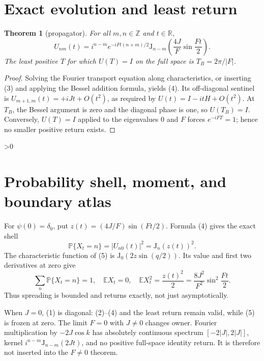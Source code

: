 \documentclass[10pt]{article}
\providecommand{\CRevisionRound}{2}
\newtheorem{theorem}{Theorem}
\newcommand{\Z}{\mathbb Z}
\begin{document}
\section{Exact evolution and least return}
\begin{theorem}[propagator]
For all $m,n\in\Z$ and $t\in\mathbb R$,
\begin{equation}
 U_{nm}(t)=i^{n-m}e^{-iFt(n+m)/2}
 \mathrm J_{n-m}\!\left(\frac{4J}{F}\sin\frac{Ft}{2}\right). \tag{4}
\end{equation}
The least positive $T$ for which $U(T)=I$ on the full space is
$T_B=2\pi/|F|$.
\end{theorem}
\begin{proof}
Solving the Fourier transport equation along characteristics, or inserting
(3) and applying the Bessel addition formula, yields (4).  Its off-diagonal
sentinel is $U_{m+1,m}(t)=+iJt+O(t^2)$, as required by
$U(t)=I-itH+O(t^2)$.  At $T_B$, the Bessel argument is zero and the diagonal
phase is one, so $U(T_B)=I$.  Conversely, $U(T)=I$ applied to the eigenvalues
$0$ and $F$ forces $e^{-iFT}=1$; hence no smaller positive return exists.
\end{proof}

\ifnum\CRevisionRound>0
\section{Probability shell, moment, and boundary atlas}
For $\psi(0)=\delta_0$, put
$z(t)=(4J/F)\sin(Ft/2)$.  Formula (4) gives the exact shell
\begin{equation}
 \mathbb P\{X_t=n\}=|U_{n0}(t)|^2=\mathrm J_n(z(t))^2.       \tag{5}
\end{equation}
The characteristic function of (5) is
$\mathrm J_0(2z\sin(q/2))$.  Its value and first two derivatives at zero give
\begin{equation}
 \sum_n\mathbb P\{X_t=n\}=1,\quad \mathbb E X_t=0,\quad
 \mathbb E X_t^2=\frac{z(t)^2}{2}=\frac{8J^2}{F^2}\sin^2\frac{Ft}{2}. \tag{6}
\end{equation}
Thus spreading is bounded and returns exactly, not just asymptotically.

When $J=0$, (1) is diagonal: (2)--(4) and the least return remain valid,
while (5) is frozen at zero.  The limit $F=0$ with $J\ne0$ changes owner.
Fourier multiplication by $-2J\cos k$ has absolutely continuous spectrum
$[-2|J|,2|J|]$, kernel $i^{n-m}\mathrm J_{n-m}(2Jt)$, and no positive
full-space identity return.  It is therefore not inserted into the $F\ne0$
theorem.
\fi
\end{document}
